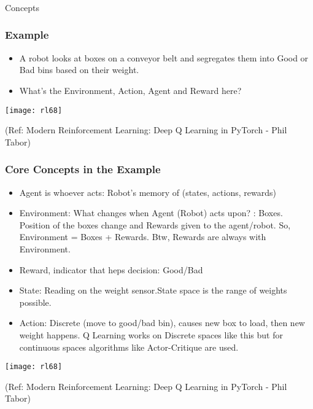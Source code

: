 \begin{frame}[fragile]\frametitle{}
\begin{center}
{\Large Concepts}
\end{center}
\end{frame}

\begin{frame}[fragile]\frametitle{Example}


\begin{itemize}
\item A robot looks at boxes on a conveyor belt and segregates them into Good or Bad bins based on their weight.
\item What's the Environment, Action, Agent and Reward here?

\end{itemize}

\begin{center}
\texttt{[image: rl68]}
\end{center}

{\tiny (Ref: Modern Reinforcement Learning: Deep Q Learning in PyTorch - Phil Tabor)}

\end{frame}

\begin{frame}[fragile]\frametitle{Core Concepts in the Example}


\begin{itemize}
\item Agent is whoever acts: Robot's memory of (states, actions, rewards)
\item Environment: What changes when Agent (Robot) acts upon? : Boxes. Position of the boxes change and Rewards given to the agent/robot. So, Environment = Boxes + Rewards. Btw, Rewards are always with Environment.
\item Reward, indicator that heps decision: Good/Bad
\item State: Reading on the weight sensor.State space is the range of weights possible.
\item Action: Discrete (move to good/bad bin), causes new box to load, then new weight happens. Q Learning works on Discrete spaces like this but for continuous spaces algorithms like Actor-Critique are used.
\end{itemize}

\begin{center}
\texttt{[image: rl68]}
\end{center}

{\tiny (Ref: Modern Reinforcement Learning: Deep Q Learning in PyTorch - Phil Tabor)}

\end{frame}

